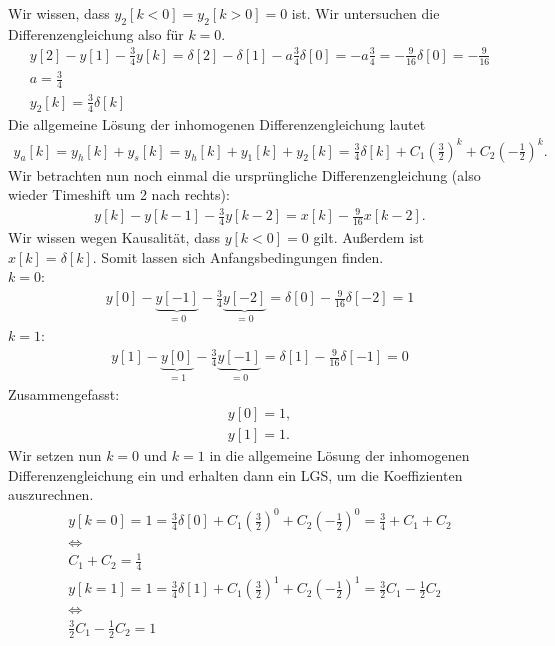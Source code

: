 \documentclass[11pt,a4paper,DIV=12]{scrartcl}
\begin{document}
%
Wir wissen, dass $y_2[k<0]=y_2[k>0]=0$ ist. Wir untersuchen die
Differenzengleichung also für $k=0$.
%
%
\begin{gather}
	y[2]-y[1]-\frac{3}{4}y[k]=\delta[2]-\delta[1]-a\frac{3}{4}\delta[0]=-a\frac{3}{4}=-\frac{9}{16}\delta[0]=-\frac{9}{16}\\
	a = \frac{3}{4}\\
	y_2[k]=\frac{3}{4}\delta[k]
\end{gather}
%
%
Die allgemeine Lösung der inhomogenen Differenzengleichung lautet
%
\begin{gather}
	y_a[k]=y_h[k]+y_s[k]=y_h[k]+y_1[k]+y_2[k]=
	\frac{3}{4}\delta[k]+C_1\left(\frac{3}{2}\right)^k+C_2\left(-\frac{1}{2}\right)^k.
\end{gather}
%
Wir betrachten nun noch einmal die ursprüngliche Differenzengleichung
(also wieder Timeshift um 2 nach rechts):
%
\begin{gather}
	y[k]-y[k-1]-\frac{3}{4}y[k-2]=x[k]-\frac{9}{16}x[k-2].
\end{gather}
%
Wir wissen wegen Kausalität, dass $y[k<0]=0$ gilt.
%
Außerdem ist $x[k]=\delta[k]$. Somit lassen sich Anfangsbedingungen finden.\\
%
$k=0$:
%
\begin{gather}
	y[0]-\underbrace{y[-1]}_{=0}-\frac{3}{4}\underbrace{y[-2]}_{=0}=\delta[0]-\frac{9}{16}\delta[-2]=1
\end{gather}
%
$k=1$:
%
\begin{gather}
	y[1]-\underbrace{y[0]}_{=1}-\frac{3}{4}\underbrace{y[-1]}_{=0}=\delta[1]-\frac{9}{16}\delta[-1]=0
\end{gather}
%
Zusammengefasst:
%
\begin{gather}
	y[0]=1,\\
	y[1]=1.
\end{gather}
%
Wir setzen nun $k=0$ und $k=1$ in die allgemeine Lösung der inhomogenen
Differenzengleichung ein und erhalten dann ein LGS, um die Koeffizienten
auszurechnen.
%
%
\begin{gather}
	y[k=0]=1=\frac{3}{4}\delta[0]+C_1\left(\frac{3}{2}\right)^0+C_2\left(-\frac{1}{2}\right)^0=\frac{3}{4}+C_1+C_2\\
	\Longleftrightarrow\nonumber \\
	C_1+C_2=\frac{1}{4}\\
	y[k=1]=1=\frac{3}{4}\delta[1]+C_1\left(\frac{3}{2}\right)^1+C_2\left(-\frac{1}{2}\right)^1=\frac{3}{2}C_1-\frac{1}{2}C_2\\
	\Longleftrightarrow\nonumber\\
	\frac{3}{2}C_1-\frac{1}{2}C_2=1
\end{gather}
\end{document}
